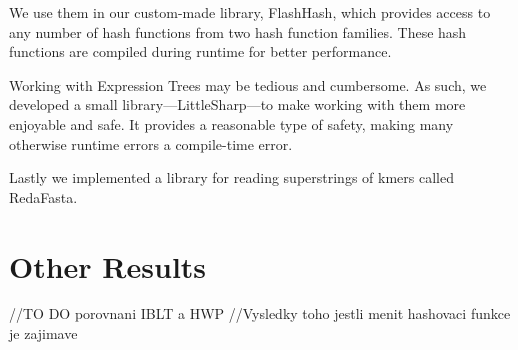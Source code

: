 We use them in our custom-made library, FlashHash, which provides access to any number of hash functions from two hash function families. These hash functions are compiled during runtime for better performance.

Working with Expression Trees may be tedious and cumbersome. As such, we developed a small library—LittleSharp—to make working with them more enjoyable and safe. It provides a reasonable type of safety, making many otherwise runtime errors a compile-time error.

Lastly we implemented a library for reading superstrings of kmers called RedaFasta. 
\section*{Other Results}
//TO DO porovnani IBLT a HWP
//Vysledky toho jestli menit hashovaci funkce je zajimave
